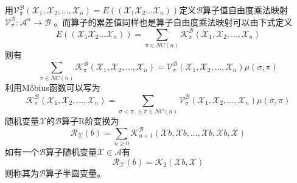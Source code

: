 \documentclass[bachelor,nocolorlinks, printoneside]{seuthesis} %
\begin{document}
\begin{Main}
用$\mathcal{V}_{\pi}^{\mathcal{B}}(\mathcal{X}_1,\mathcal{X}_2,...,\mathcal{X}_n) = E((\mathcal{X}_1\mathcal{X}_2...\mathcal{X}_n))$定义$\mathcal{B}$算子值自由度乘法映射$\mathcal{V}_{\pi}^{\mathcal{B}} :\mathcal{A}^n \rightarrow \mathcal{B}$
。而算子的累差值同样也是算子自由度乘法映射可以由下式定义
\begin{equation}\label{key}
E((\mathcal{X}_1\mathcal{X}_2...\mathcal{X}_n)) = \sum_{\pi \in NC(n)} \mathcal{K}_{\pi}^{\mathcal{B}}(\mathcal{X}_1,\mathcal{X}_2,...,\mathcal{X}_n)
\end{equation}
则有
\begin{equation}\label{key}
\sum_{\pi \in NC(n)} \mathcal{K}_{\pi}^{\mathcal{B}}(\mathcal{X}_1,\mathcal{X}_2,...,\mathcal{X}_n) = \mathcal{V}_{\sigma}^{\mathcal{B}}(\mathcal{X}_1,\mathcal{X}_2,...,\mathcal{X}_n)\mu(\sigma,\pi)
\end{equation}
利用M\"{o}bius函数可以写为
\begin{equation}\label{key}
\mathcal{K}_{\pi}^{\mathcal{B}}(\mathcal{X}_1,\mathcal{X}_2,...,\mathcal{X}_n) = \sum_{\sigma<\pi, \in \pi \in NC(n)} \mathcal{V}_{\sigma}^{\mathcal{B}}(\mathcal{X}_1,\mathcal{X}_2,...,\mathcal{X}_n)\mu(\sigma,\pi)
\end{equation}
随机变量$\mathcal{X}$的$\mathcal{B}$算子R阶变换为
\begin{equation}\label{key}
\mathcal{R}_{\mathcal{X}}(b)=\sum_{n \geq 0} \mathcal{K}_{n+1}^{\mathcal{B}}(\mathcal{X}b,\mathcal{X}b,...,\mathcal{X}b,\mathcal{X}b,\mathcal{X})
\end{equation}
如有一个$\mathcal{B}$算子随机变量$\mathcal{X} \in \mathcal{A}$有
\begin{equation}\label{key}
\mathcal{R}_{\mathcal{X}}(b)=\mathcal{K}_2(\mathcal{X}b,\mathcal{X})
\end{equation}
则称其为$\mathcal{B}$算子半圆变量。


\end{Main}
\end{document}
